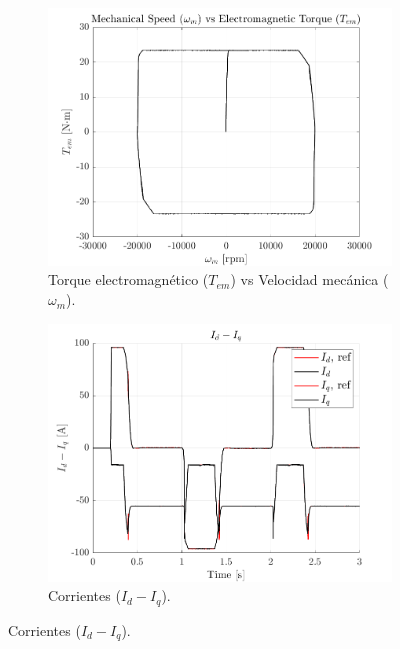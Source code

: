 \begin{figure}[H]
    \centering

    \begin{subfigure}{0.4\textwidth}
        \includegraphics[width=\linewidth]{fig/PLECS_Tem.png}
        \caption{Torque electromagnético ($T_{em}$) vs Velocidad mecánica ($\omega_{m}$).}
    \end{subfigure}
    \begin{subfigure}{0.4\textwidth}
        \includegraphics[width=\linewidth]{fig/PLECS_idiq.png}
        \caption{Corrientes ($I_{d} - I_{q}$).}
    \end{subfigure}


\end{figure}
